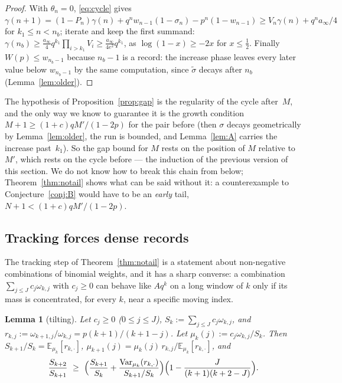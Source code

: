 \documentclass[11pt]{article}
\newtheorem{lemma}[theorem]{Lemma}
\theoremstyle{definition}
\begin{document}
\begin{proof}
  With $\theta_n=0$, \eqref{eq:cycle} gives
  $\gamma(n+1)=(1-P_n)\gamma(n)+q^nw_{n-1}(1-\sigma_n)-p^n(1-w_{n-1})
  \ge V_n\gamma(n)+q^na_\infty/4$ for $k_1\le n<n_b$; iterate and keep the
  first summand: $\gamma(n_b)\ge\tfrac{a_\infty}4q^{k_1}\prod_{i>k_1}V_i
  \ge\tfrac{a_\infty}{4e^2}q^{k_1}$, as $\log(1-x)\ge-2x$ for $x\le\tfrac12$.
  Finally $W(p)\le w_{n_b-1}$ because $n_b-1$ is a record: the increase
  phase leaves every later value below $w_{n_b-1}$ by the same
  computation, since $\tilde\sigma$ decays after $n_b$ (Lemma~\ref{lem:older}).
\end{proof}

The hypothesis of Proposition~\ref{prop:gap} is the regularity of the
cycle after~$M$, and the only way we know to guarantee it is the
growth condition $M+1\ge(1+c)qM'/(1-2p)$ for the pair before
(then $\sigma$ decays geometrically by Lemma~\ref{lem:older}, the run
is bounded, and Lemma~\ref{lem:A} carries the increase past~$k_1$).
So the gap bound for $M$ rests on the position of $M$ relative to
$M'$, which rests on the cycle before --- the induction of the
previous version of this section.  We do not know how to break this
chain from below; Theorem~\ref{thm:notail} shows what can be said
without it: a counterexample to Conjecture~\ref{conj:B} would have to
be an \emph{early} tail, $N+1<(1+c)qM'/(1-2p)$.

\subsection{Tracking forces dense records}\label{sec:tracking}

The tracking step of Theorem~\ref{thm:notail} is a statement about
non-negative combinations of binomial weights, and it has a sharp
converse: a combination $\sum_{j\le J}c_j\omega_{k,j}$ with $c_j\ge0$
can behave like $Aq^k$ on a long window of $k$ only if its mass is
concentrated, for every $k$, near a specific moving index.

\begin{lemma}[tilting]\label{lem:tilting}
  Let $c_j\ge0$ ($0\le j\le J$), $S_k:=\sum_{j\le J}c_j\omega_{k,j}$,
  and $r_{k,j}:=\omega_{k+1,j}/\omega_{k,j}=p(k+1)/(k+1-j)$.  Let
  $\mu_k(j):=c_j\omega_{k,j}/S_k$.  Then $S_{k+1}/S_k=\mathbb E_{\mu_k}[r_{k,\cdot}]$,
  $\mu_{k+1}(j)=\mu_k(j)\,r_{k,j}/\mathbb E_{\mu_k}[r_{k,\cdot}]$, and
  \[
    \frac{S_{k+2}}{S_{k+1}}
    \ \ge\ \Bigl(\frac{S_{k+1}}{S_k}+\frac{\operatorname{Var}_{\mu_k}(r_{k,\cdot})}{S_{k+1}/S_k}\Bigr)
    \Bigl(1-\frac{J}{(k+1)(k+2-J)}\Bigr).
  \]
\end{lemma}
\end{document}
